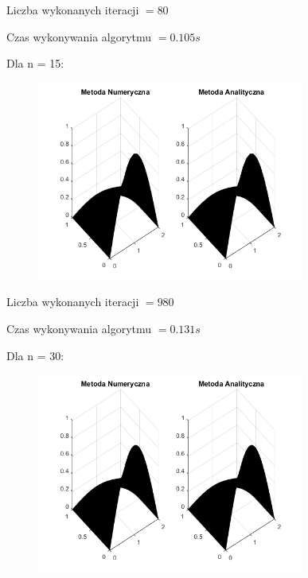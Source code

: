 Liczba wykonanych iteracji $ = 80 $

Czas wykonywania algorytmu $ = 0.105 s$

Dla n = 15:

\begin{figure}[!ht]
	\begin{center}
		\includegraphics[width=0.78\textwidth]{Lab7/charts/btcs/15.png}
	\end{center}
\end{figure}

Liczba wykonanych iteracji $ = 980 $

Czas wykonywania algorytmu $ = 0.131 s$

\newpage

Dla n = 30:

\begin{figure}[!ht]
	\begin{center}
		\includegraphics[width=0.78\textwidth]{Lab7/charts/btcs/30.png}
	\end{center}
\end{figure}

